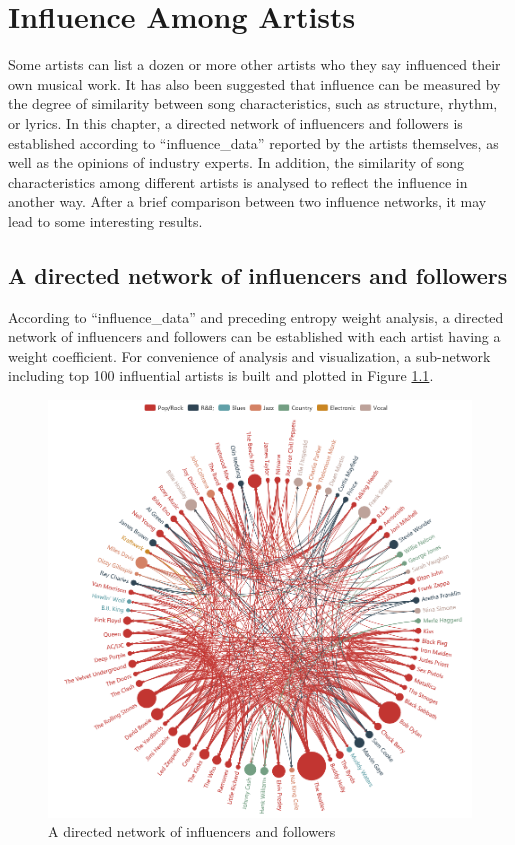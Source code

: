 
\chapter{Influence Among Artists}

Some artists can list a dozen or more other artists who they say influenced their own musical work. It has also been suggested that influence can be measured by the degree of similarity between song characteristics, such as structure, rhythm, or lyrics. In this chapter, a directed network of influencers and followers is established according to ``influence\_data'' reported by the artists themselves, as well as the opinions of industry experts. In addition, the similarity of song characteristics among different artists is analysed to reflect the influence in another way. After a brief comparison between two influence networks, it may lead to some interesting results.

\section{A directed network of influencers and followers}

According to ``influence\_data'' and preceding entropy weight analysis, a directed network of influencers and followers can be established with each artist having a weight coefficient. For convenience of analysis and visualization, a sub-network including top 100 influential artists is built and plotted in Figure \ref{fig:influence}.\par

\begin{figure}
\includegraphics[width=1.25\textwidth]{figures/xdq/influence.png}
\setlength{\leftskip}{0pt plus 1fil minus \marginparwidth}
\setlength{\rightskip}{\leftskip}
\caption{A directed network of influencers and followers}
\label{fig:influence}
\end{figure}

